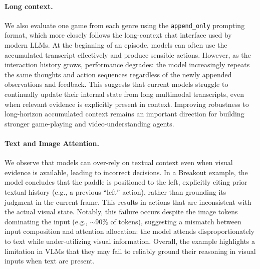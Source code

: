 \paragraph{Long context.}

We also evaluate one game from each genre using the \texttt{append\_only} prompting format, which more closely follows the long-context chat interface used by modern LLMs. At the beginning of an episode, models can often use the accumulated transcript effectively and produce sensible actions. However, as the interaction history grows, performance degrades: the model increasingly repeats the same thoughts and action sequences regardless of the newly appended observations and feedback. This suggests that current models struggle to continually update their internal state from long multimodal transcripts, even when relevant evidence is explicitly present in context. Improving robustness to long-horizon accumulated context remains an important direction for building stronger game-playing and video-understanding agents.


\paragraph{Text and Image Attention.}
We observe that models can over-rely on textual context even when visual evidence is available, leading to incorrect decisions. In a Breakout example, the model concludes that the paddle is positioned to the left, explicitly citing prior textual history (e.g., a previous ``left'' action), rather than grounding its judgment in the current frame. This results in actions that are inconsistent with the actual visual state. Notably, this failure occurs despite the image tokens dominating the input (e.g., $\sim$90\% of tokens), suggesting a mismatch between input composition and attention allocation: the model attends disproportionately to text while under-utilizing visual information. Overall, the example highlights a limitation in VLMs that they may fail to reliably ground their reasoning in visual inputs when text are present.









